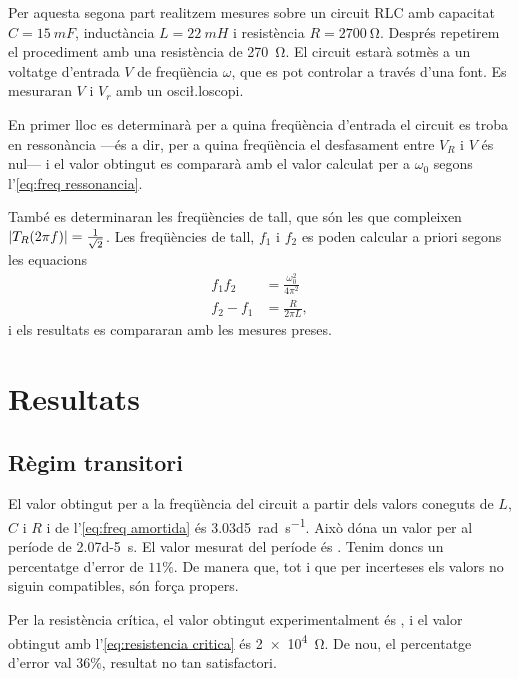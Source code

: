 Per aquesta segona part realitzem mesures sobre un circuit RLC amb capacitat \( C = \SI{15}{mF} \), inductància \( L = \SI{22}{mH} \) i resistència \( R = \SI{2700}{\ohm} \). Després repetirem el procediment amb una resistència de \SI{270}{\ohm}. El circuit estarà sotmès a un voltatge d'entrada \( V \) de freqüència \( \omega \), que es pot controlar a través d'una font. Es mesuraran \( V \) i \( V_r \) amb un osci\l.loscopi.  

En primer lloc es determinarà per a quina freqüència d'entrada el circuit es troba en ressonància ---és a dir, per a quina freqüència el desfasament entre \( V_R \) i \( V \) és nul--- i el valor obtingut es compararà amb el valor calculat per a \( \omega_0 \) segons l'\cref{eq:freq ressonancia}. 

També es determinaran les freqüències de tall, que són les que compleixen \( \left\lvert T_R(2\pi f) \right\rvert = \frac{1}{\sqrt{2}} \). Les freqüències de tall, \( f_1 \) i \( f_2 \) es poden calcular a priori segons les equacions
\begin{equation} \label{eq:freqs de tall}
	\begin{aligned}
		f_1f_2 &=  \frac{\omega_0^2}{4\pi^2} \\
		f_2 - f_1 &= \frac{R}{2\pi L},
	\end{aligned}
\end{equation}
i els resultats es compararan amb les mesures preses. 

\section{Resultats}
\subsection{Règim transitori}
El valor obtingut per a la freqüència del circuit a partir dels valors coneguts de \( L \), \( C \) i \( R \) i de l'\cref{eq:freq amortida} és \SI{3.03d5}{rad.s^{-1}}. Això dóna un valor per al període de \SI{2.07d-5}{s}. El valor mesurat del període és . Tenim doncs un percentatge d'error de $11\%$. De manera que, tot i que per incerteses els valors no siguin compatibles, són força propers.

Per la resistència crítica, el valor obtingut experimentalment és , i el valor obtingut amb l'\cref{eq:resistencia critica} és \SI{2e4}{\ohm}. De nou, el percentatge d'error val $36\%$, resultat no tan satisfactori. 

